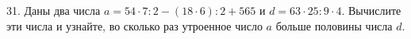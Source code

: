 31. Даны два числа $a=54\cdot7:2-(18\cdot6):2+565$ и $d=63\cdot25:9\cdot4.$ Вычислите эти числа и узнайте, во сколько раз утроенное число $a$ больше половины числа $d.$\\
